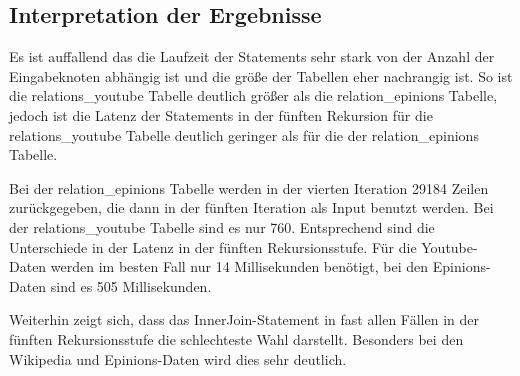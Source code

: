 \subsection{Interpretation der Ergebnisse}

Es ist auffallend das die Laufzeit der Statements sehr stark von der Anzahl der Eingabeknoten abhängig ist und die größe der Tabellen eher nachrangig ist. So ist die relations\_youtube Tabelle deutlich größer als die relation\_epinions Tabelle, jedoch ist die Latenz der Statements in der fünften Rekursion für die relations\_youtube Tabelle deutlich geringer als für die der relation\_epinions Tabelle.  

Bei der relation\_epinions Tabelle werden in der vierten Iteration 29184 Zeilen zurückgegeben, die dann in der fünften Iteration als Input benutzt werden. Bei der relations\_youtube Tabelle sind es nur 760. Entsprechend sind die Unterschiede in der Latenz in der fünften Rekursionsstufe. Für die Youtube-Daten werden im besten Fall nur 14 Millisekunden benötigt, bei den Epinions-Daten sind es 505 Millisekunden.

Weiterhin zeigt sich, dass das InnerJoin-Statement in fast allen Fällen in der fünften Rekursionsstufe die schlechteste Wahl darstellt. Besonders bei den Wikipedia und Epinions-Daten wird dies sehr deutlich.
